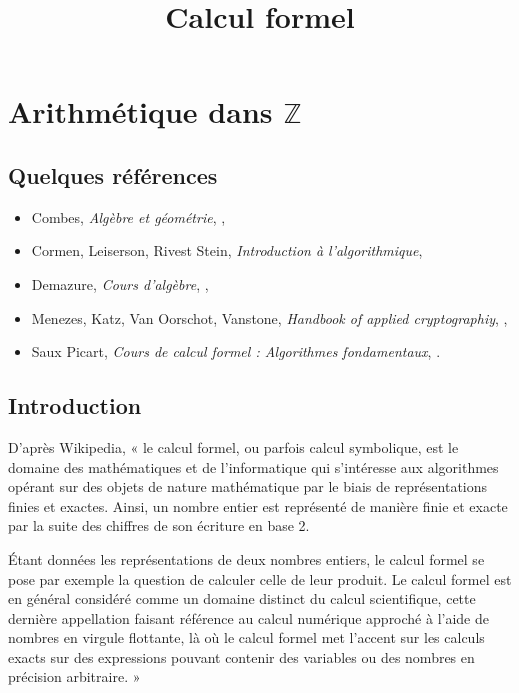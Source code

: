 \documentclass[12pt]{report}
\title{\Huge{Calcul formel}}
\begin{document}
\maketitle

\tableofcontents






\chapter{Arithmétique dans $\mathbb{Z}$}

\section{Quelques références}

\begin{itemize}
\item Combes, \textit{Algèbre et géométrie}, \cite{combes1998algebre},

\item Cormen, Leiserson, Rivest Stein, \textit{Introduction à l'algorithmique}, \cite{cormen2009introduction}

\item Demazure, \textit{Cours d'algèbre}, \cite{demazure2008cours},

\item  Menezes, Katz, Van Oorschot, Vanstone, \textit{Handbook of applied cryptographiy}, \cite{menezes1996handbook},

\item Saux Picart, \textit{Cours de calcul formel : Algorithmes fondamentaux}, \cite{picart1999cours}.
\end{itemize}



\section{Introduction}

D'après Wikipedia, « le calcul formel, ou parfois calcul symbolique, est le domaine des mathématiques et de l’informatique qui s’intéresse aux algorithmes opérant sur des objets de nature mathématique par le biais de représentations finies et exactes. Ainsi, un nombre entier est représenté de manière finie et exacte par la suite des chiffres de son écriture en base 2.

 Étant données les représentations de deux nombres entiers, le calcul formel se pose par exemple la question de calculer celle de leur produit.  Le calcul formel est en général considéré comme un domaine distinct du calcul scientifique, cette dernière appellation faisant référence au calcul numérique approché à l'aide de nombres en virgule flottante, là où le calcul formel met l'accent sur les calculs exacts sur des expressions pouvant contenir des variables ou des nombres en précision arbitraire. »
 
\end{document}
